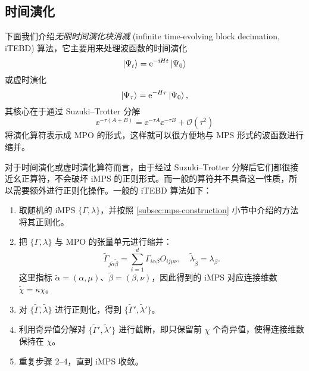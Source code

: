 \subsection{时间演化}
\label{subsec:mps-time-evolution}

下面我们介绍\emph{无限时间演化块消减} (infinite time-evolving block decimation, iTEBD)\cite{vidal2007classical,orus2008infinite} 算法，它主要用来处理波函数的时间演化
\begin{equation}
  \ket{\Psi_t} = \ee^{-\ii Ht} \ket{\Psi_0}
\end{equation}
或虚时演化
\begin{equation}
  \ket{\Psi_\tau} = \ee^{-H\tau} \ket{\Psi_0},
\end{equation}
其核心在于通过 Suzuki--Trotter 分解\cite{sornborger1999higher}
\begin{equation}
  \ee^{-\tau(A+B)} = \ee^{-\tau A} \ee^{-\tau B} + \mathcal{O}(\tau^2)
\end{equation}
将演化算符表示成 MPO 的形式，这样就可以很方便地与 MPS 形式的波函数进行缩并。

对于时间演化或虚时演化算符而言，由于经过 Suzuki--Trotter 分解后它们都很接近幺正算符，不会破坏 iMPS 的正则形式。而一般的算符并不具备这一性质，所以需要额外进行正则化操作。一般的 iTEBD 算法如下：

\begin{enumerate}
  \item 取随机的 iMPS $\{\Gamma,\lambda\}$，并按照 \ref{subsec:mps-construction} 小节中介绍的方法将其正则化。

  \item 把 $\{\Gamma,\lambda\}$ 与 MPO 的张量单元进行缩并：
    \begin{equation}
      \tilde{\Gamma}_{j\tilde{\alpha}\tilde{\beta}} = \sum_{i=1}^d \Gamma_{i\alpha\beta} O_{ij\mu\nu}, \quad
      \tilde{\lambda}_{\tilde{\beta}} = \lambda_\beta.
    \end{equation}
    这里指标 $\tilde{\alpha}=(\alpha,\mu)$、$\tilde{\beta}=(\beta,\nu)$，因此得到的 iMPS 对应连接维数 $\tilde{\chi}=\kappa\chi$。

  \item 对 $\{\tilde{\Gamma},\tilde{\lambda}\}$ 进行正则化，得到 $\{\tilde{\Gamma}',\tilde{\lambda}'\}$。

  \item 利用奇异值分解对 $\{\tilde{\Gamma}',\tilde{\lambda}'\}$ 进行截断，即只保留前 $\chi$ 个奇异值，使得连接维数保持在 $\chi$。

  \item 重复步骤 2--4，直到 iMPS 收敛。
\end{enumerate}

